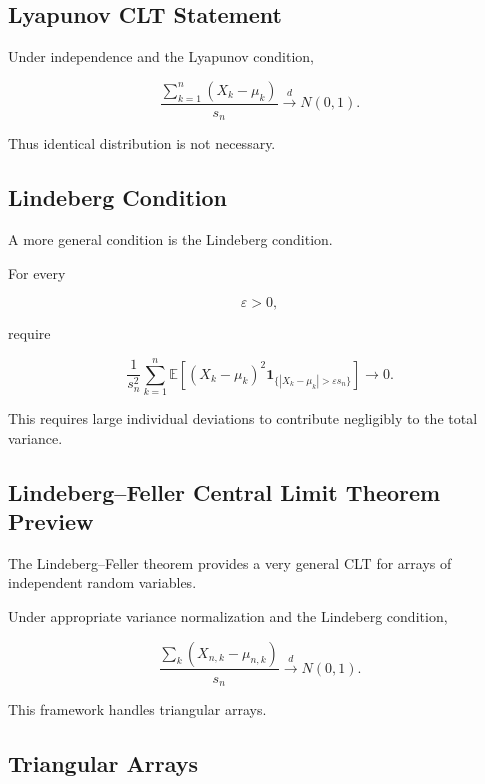 \subsection{Lyapunov CLT Statement}
\label{subsec:lyapunov-clt-statement}

Under independence and the Lyapunov condition,

\[
\boxed{
\frac{
\sum_{k=1}^{n}
(X_k-\mu_k)
}{
s_n
}
\xrightarrow{d}
N(0,1).
}
\]

Thus identical distribution is not necessary.

\subsection{Lindeberg Condition}
\label{subsec:lindeberg-condition}

A more general condition is the Lindeberg condition.

For every

\[
\varepsilon>0,
\]

require

\[
\boxed{
\frac1{s_n^2}
\sum_{k=1}^{n}
\mathbb{E}
\left[
(X_k-\mu_k)^2
\mathbf{1}_{
\{
|X_k-\mu_k|
>
\varepsilon s_n
\}
}
\right]
\to0.
}
\]

This requires large individual deviations to contribute negligibly to
the total variance.

\subsection{Lindeberg--Feller Central Limit Theorem Preview}
\label{subsec:lindeberg-feller-clt}

The Lindeberg--Feller theorem provides a very general CLT for arrays of
independent random variables.

Under appropriate variance normalization and the Lindeberg condition,

\[
\boxed{
\frac{
\sum_k
(X_{n,k}-\mu_{n,k})
}{
s_n
}
\xrightarrow{d}
N(0,1).
}
\]

This framework handles triangular arrays.

\subsection{Triangular Arrays}
\label{subsec:triangular-arrays}

